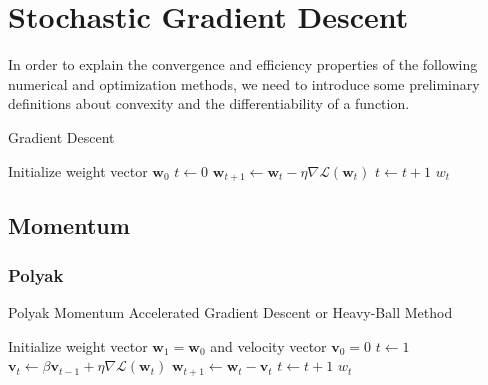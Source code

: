 \section{Stochastic Gradient Descent}

In order to explain the convergence and efficiency properties of the following numerical and optimization methods, we need to introduce some preliminary definitions about convexity and the differentiability of a function.

\begin{algorithm}[h!]
	\caption{Gradient Descent}
	\label{alg:gd}
	\begin{algorithmic}[1]
			\State Initialize weight vector $\textbf{w}_0$
			\State $t \gets 0$
				\State $\textbf{w}_{t+1} \gets \textbf{w}_t - \eta \nabla \mathcal{L}(\textbf{w}_t)$
				\State $t \gets t + 1$
			\EndWhile
			\State \Return $w_t$
		\EndFunction
	\end{algorithmic}
\end{algorithm}

\subsection{Momentum}



\subsubsection{Polyak}

\begin{algorithm}[h!]
	\caption{Polyak Momentum Accelerated Gradient Descent or Heavy-Ball Method}
	\label{alg:sgd}
	\begin{algorithmic}[1]
			\State Initialize weight vector $\textbf{w}_1 = \textbf{w}_0$ and velocity vector $\textbf{v}_0 = 0$
			\State $t \gets 1$
				\State $\textbf{v}_t \gets \beta \textbf{v}_{t-1} + \eta \nabla \mathcal{L}(\textbf{w}_t)$
				\State $\textbf{w}_{t+1} \gets \textbf{w}_t - \textbf{v}_t$
				\State $t \gets t + 1$
			\EndWhile
			\State \Return $w_t$
		\EndFunction
	\end{algorithmic}
\end{algorithm}

